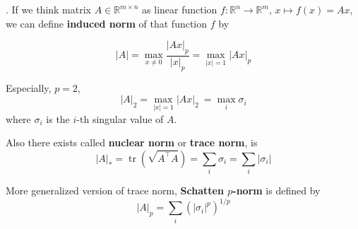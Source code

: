 \documentclass[8pt]{beamer}
\newcommand{\mbb}[1]{\mathbb{#1}}
\newcommand{\tb}[1]{\textbf{#1}}
\newcommand{\abs}[1]{\left\lvert #1 \right\rvert}
\newcommand{\tr}[1]{\operatorname{tr}\!\left(#1\right)}
\begin{document}
\begin{frame}{.}
    If we think matrix $A \in \mbb{R}^{m \times n}$ as linear function $f: \mbb{R}^n \rightarrow \mbb{R}^m$, $x \mapsto f(x) = Ax$, we can define \tb{induced norm} of that function $f$ by 

    \[\abs{A} = \max_{x\neq 0}\frac{\abs{Ax}_p}{\abs{x}_p} = \max_{\abs{x} = 1} \abs{Ax}_p\]

    Especially, $p=2$,
    \[
    \abs{A}_2 = \max_{\abs{x} = 1} \abs{Ax}_2\ = \max_i \sigma_i
    \] where $\sigma_i$ is the $i$-th singular value of $A$.

    Also there exists called \tb{nuclear norm} or \tb{trace norm}, is
    \[
    \abs{A}_\ast = \tr{\sqrt{A^\top A}} = \sum_i \sigma_i = \sum_i \abs{\sigma_i}
    \]

    More generalized version of trace norm, \tb{Schatten $p$-norm} is defined by
    \[
    \abs{A}_p = \sum_i \left(\abs{\sigma_i}^p\right)^{1/p}
    \]
\end{frame}
\end{document}

